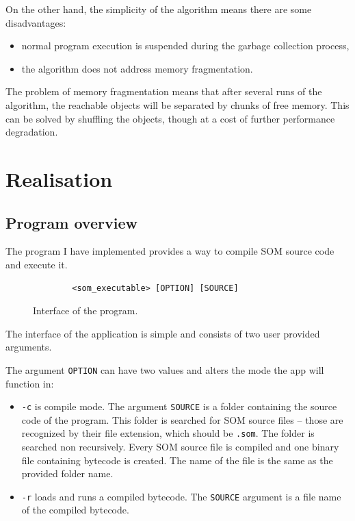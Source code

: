 \documentclass[thesis=M,english]{FITthesis}[2019/12/23]
\begin{document}
On the other hand, the simplicity of the algorithm means there are some disadvantages:
\begin{itemize}
	\item normal program execution is suspended during the garbage collection process,
	\item the algorithm does not address memory fragmentation.
\end{itemize}

The problem of memory fragmentation means that after several runs of the algorithm, the reachable objects will be separated
by chunks of free memory. This can be solved by shuffling the objects, though at a cost of further performance degradation.

\chapter{Realisation}

\section{Program overview}
The program I have implemented provides a way to compile SOM source code and execute it.

\begin{figure}[h!]
	\centering
	\begin{verbatim}
		<som_executable> [OPTION] [SOURCE]
	\end{verbatim}
	\caption{Interface of the program.}
	\label{fig:prog_interface}
\end{figure}

The interface of the application is simple and consists of two user provided arguments.

The argument \texttt{OPTION} can have two values and alters the mode the app will function in:
\begin{itemize}
	\item \texttt{-c} is compile mode. The argument \texttt{SOURCE} is a folder containing the source code of the program.
		This folder is searched for SOM source files -- those are recognized by their file extension, which should be \texttt{.som}.
		The folder is searched non recursively. Every SOM source file is compiled and one binary file containing bytecode is created.
		The name of the file is the same as the provided folder name.
	\item \texttt{-r} loads and runs a compiled bytecode. The \texttt{SOURCE} argument is a file name of the compiled bytecode.
\end{itemize}
\end{document}
